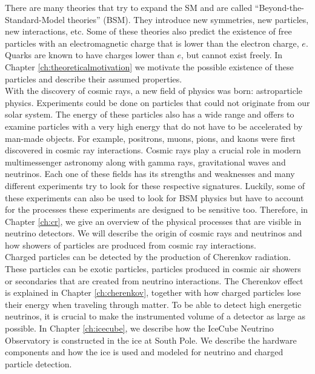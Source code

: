 \noindent There are many theories that try to expand the SM and are called ``Beyond-the-Standard-Model theories'' (BSM). They introduce new symmetries, new particles, new interactions, etc. Some of these theories also predict the existence of free particles with an electromagnetic charge that is lower than the electron charge, $e$. Quarks are known to have charges lower than $e$, but cannot exist freely. In Chapter \ref{ch:theoreticalmotivation} we motivate the possible existence of these particles and describe their assumed properties.\\

\noindent With the discovery of cosmic rays, a new field of physics was born: astroparticle physics. Experiments could be done on particles that could not originate from our solar system. The energy of these particles also has a wide range and offers to examine particles with a very high energy that do not have to be accelerated by man-made objects. For example, positrons, muons, pions, and kaons were first discovered in cosmic ray interactions. Cosmic rays play a crucial role in modern multimessenger astronomy along with gamma rays, gravitational waves and neutrinos. Each one of these fields has its strengths and weaknesses and many different experiments try to look for these respective signatures. Luckily, some of these experiments can also be used to look for BSM physics but have to account for the processes these experiments are designed to be sensitive too. Therefore, in Chapter \ref{ch:cr}, we give an overview of the physical processes that are visible in neutrino detectors. We will describe the origin of cosmic rays and neutrinos and how showers of particles are produced from cosmic ray interactions.\\

\noindent Charged particles can be detected by the production of Cherenkov radiation. These particles can be exotic particles, particles produced in cosmic air showers or secondaries that are created from neutrino interactions. The Cherenkov effect is explained in Chapter \ref{ch:cherenkov}, together with how charged particles lose their energy when traveling through matter.
To be able to detect high energetic neutrinos, it is crucial to make the instrumented volume of a detector as large as possible. In Chapter \ref{ch:icecube}, we describe how the IceCube Neutrino Observatory is constructed in the ice at South Pole. We describe the hardware components and how the ice is used and modeled for neutrino and charged particle detection.


